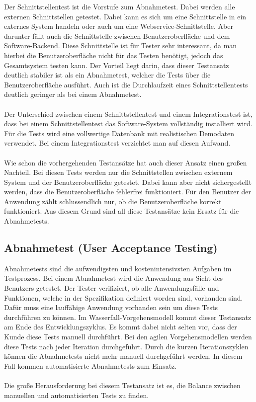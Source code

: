 Der Schnittstellentest ist die Vorstufe zum Abnahmetest. Dabei werden alle externen Schnittstellen getestet. Dabei kann es sich um eine Schnittstelle in ein externes System handeln oder auch um eine Webservice-Schnittstelle. Aber darunter fällt auch die Schnittstelle zwischen Benutzeroberfläche und dem Software-Backend. Diese Schnittstelle ist für Tester sehr interessant, da man hierbei die Benutzeroberfläche nicht für das Testen benötigt, jedoch das Gesamtsystem testen kann. Der Vorteil liegt darin, dass dieser Testansatz deutlich stabiler ist als ein Abnahmetest, welcher die Tests über die Benutzeroberfläche ausführt. Auch ist die Durchlaufzeit eines Schnittstellentests deutlich geringer als bei einem Abnahmetest.\\
\\
Der Unterschied zwischen einem Schnittstellentest und einem Integrationstest ist, dass bei einem Schnittstellentest das Software-System vollständig installiert wird. Für die Tests wird eine vollwertige Datenbank mit realistischen Demodaten verwendet. Bei einem Integrationstest verzichtet man auf diesen Aufwand.\\
\\
Wie schon die vorhergehenden Testansätze hat auch dieser Ansatz einen großen Nachteil. Bei diesen Tests werden nur die Schnittstellen zwischen externem System und der Benutzeroberfläche getestet. Dabei kann aber nicht sichergestellt werden, dass die Benutzeroberfläche fehlerfrei funktioniert. Für den Benutzer der Anwendung zählt schlussendlich nur, ob die Benutzeroberfläche korrekt funktioniert. Aus diesem Grund sind all diese Testansätze kein Ersatz für die Abnahmetests.

\subsection{Abnahmetest (User Acceptance Testing)}

Abnahmetests sind die aufwendigsten und kostenintensivsten Aufgaben im Testprozess. Bei einem Abnahmetest wird die Anwendung aus Sicht des Benutzers getestet. Der Tester verifiziert, ob alle Anwendungsfälle und Funktionen, welche in der Spezifikation definiert worden sind, vorhanden sind. Dafür muss eine lauffähige Anwendung vorhanden sein um diese Tests durchführen zu können. Im Wasserfall-Vorgehensmodell kommt dieser Testansatz am Ende des Entwicklungszyklus. Es kommt dabei nicht selten vor, dass der Kunde diese Tests manuell durchführt. Bei den agilen Vorgehensmodellen werden diese Tests nach jeder Iteration durchgeführt. Durch die kurzen Iterationszyklen können die Abnahmetests nicht mehr manuell durchgeführt werden. In diesem Fall kommen automatisierte Abnahmetests zum Einsatz. \\
\\
Die große Herausforderung bei diesem Testansatz ist es, die Balance zwischen manuellen und automatisierten Tests zu finden.

